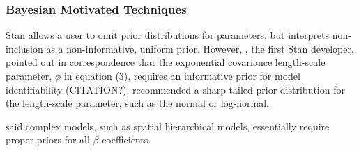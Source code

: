 \documentclass{article}
\begin{document}
\subsubsection*{Bayesian Motivated Techniques}

Stan allows a user to omit prior distributions for parameters, but interprets non-inclusion as a non-informative, uniform prior. However, \cite{Gelman}, the first Stan developer, pointed out in correspondence that the exponential covariance length-scale parameter, $\phi$ in equation (3), requires an informative prior for model identifiability (CITATION?). \cite{Trangucci} recommended a sharp tailed prior distribution for the length-scale parameter, such as the normal or log-normal.


\cite{Trangucci} said complex models, such as spatial hierarchical models, essentially require proper priors for all $\beta$ coefficients.
\end{document}
